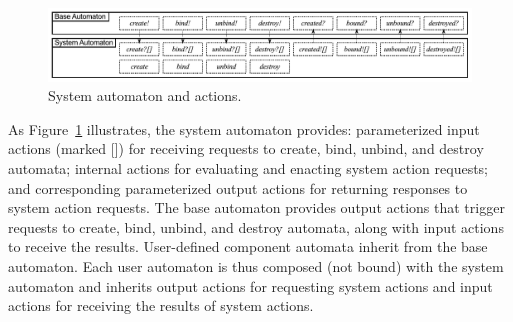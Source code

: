 \begin{figure}
\center
\includegraphics[width=\textwidth]{system_action}
\caption{System automaton and actions.}
\label{system_action}
\end{figure}
As Figure~\ref{system_action} illustrates, the system automaton provides: parameterized input actions (marked []) for receiving requests to create, bind, unbind, and destroy automata; internal actions for evaluating and enacting system action requests; and corresponding parameterized output actions for returning responses to system action requests.
The base automaton provides output actions that trigger requests to create, bind, unbind, and destroy automata, along with
input actions to receive the results.
User-defined component automata inherit from the base automaton.
Each user automaton is thus composed (not bound) with the system automaton and inherits output actions for requesting system actions and input actions for receiving the results of system actions.

